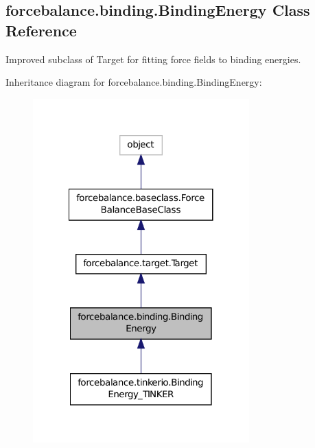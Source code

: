 \hypertarget{classforcebalance_1_1binding_1_1BindingEnergy}{\subsection{forcebalance.\-binding.\-Binding\-Energy Class Reference}
\label{classforcebalance_1_1binding_1_1BindingEnergy}
}


Improved subclass of Target for fitting force fields to binding energies.  




Inheritance diagram for forcebalance.\-binding.\-Binding\-Energy\-:\nopagebreak
\begin{figure}[H]
\begin{center}
\leavevmode
\includegraphics[width=236pt]{classforcebalance_1_1binding_1_1BindingEnergy__inherit__graph}
\end{center}
\end{figure}



